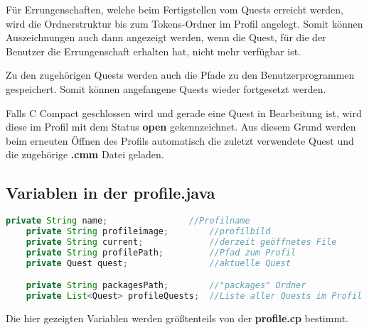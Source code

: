 Für Errungenschaften, welche beim Fertigstellen vom Quests erreicht werden, wird die Ordnerstruktur bis zum Tokens-Ordner im Profil angelegt. Somit können Auszeichnungen auch dann angezeigt werden, wenn die Quest, für die der Benutzer die Errungenschaft erhalten hat, nicht mehr verfügbar ist.

Zu den zugehörigen Quests werden auch die Pfade zu den Benutzerprogrammen gespeichert. Somit können angefangene Quests wieder fortgesetzt werden.

Falls C Compact geschlossen wird und gerade eine Quest in Bearbeitung ist, wird diese im Profil mit dem Status \textbf{open} gekennzeichnet. Aus diesem Grund werden beim erneuten Öffnen des Profils automatisch die zuletzt verwendete Quest und die zugehörige \textbf{.cmm} Datei geladen.

\subsection{Variablen in der profile.java}
\begin{lstlisting}[language=JAVA]
	private String name;				//Profilname				
	private String profileimage;		//profilbild
	private String current;				//derzeit geöffnetes File
	private String profilePath;			//Pfad zum Profil
	private Quest quest;				//aktuelle Quest

	private String packagesPath;		//"packages" Ordner
	private List<Quest> profileQuests;	//Liste aller Quests im Profil
\end{lstlisting}
Die hier gezeigten Variablen werden größtenteils von der \textbf{profile.cp} bestimmt. 
